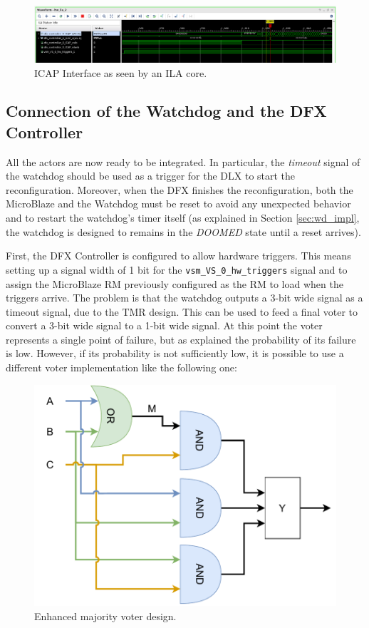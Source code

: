 \begin{figure}[H]
\centering
\includegraphics[width=0.95\linewidth]{images/chapter4/ila_icap.png}
\caption{ICAP Interface as seen by an ILA core.}
\label{fig:icap_ila}
\end{figure}

\subsection{Connection of the Watchdog and the DFX Controller}
All the actors are now ready to be integrated. In particular, the \textit{timeout} signal of the watchdog should be used as a trigger for the DLX to start the reconfiguration. Moreover, when the DFX finishes the reconfiguration, both the MicroBlaze and the Watchdog must be reset to avoid any unexpected behavior and to restart the watchdog's timer itself (as explained in Section \ref{sec:wd_impl}, the watchdog is designed to remains in the \textit{DOOMED} state until a reset arrives). \bigskip

First, the DFX Controller is configured to allow hardware triggers. This means setting up a signal width of 1 bit for the \texttt{vsm\_VS\_0\_hw\_triggers} signal and to assign the MicroBlaze RM previously configured as the RM to load when the triggers arrive. The problem is that the watchdog outputs a 3-bit wide signal as a timeout signal, due to the TMR design. This can be used to feed a final voter to convert a 3-bit wide signal to a 1-bit wide signal. At this point the voter represents a single point of failure, but as explained the probability of its failure is low. However, if its probability is not sufficiently low, it is possible to use a different voter implementation like the following one:

\begin{figure}[H]
\centering
\includegraphics[width=0.40\linewidth]{images/chapter4/voter_enh.pdf}
\caption{Enhanced majority voter design.}
\end{figure}

